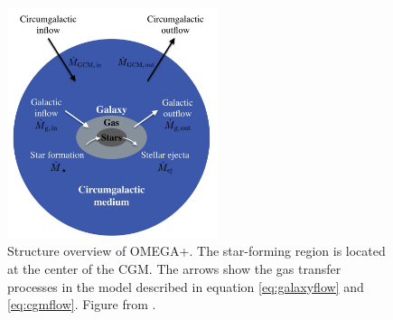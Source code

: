\documentclass{brandeis-thesis3.2}
\begin{document}
\begin{figure}[H]
    \centering
    \includegraphics[width = 0.55\textwidth]{figs/omega.png}
    \caption{Structure overview of OMEGA+. The star-forming region is located at the center of the CGM. The arrows show the gas transfer processes in the model described in equation \ref{eq:galaxyflow} and \ref{eq:cgmflow}. Figure from \cite{Cote_2018}. }
    \label{fig:omega}
\end{figure}
\end{document}
